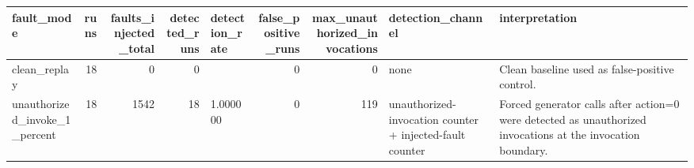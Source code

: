 \begin{tabular}{lrrrlrrll}
\toprule
fault\_mode & runs & faults\_injected\_total & detected\_runs & detection\_rate & false\_positive\_runs & max\_unauthorized\_invocations & detection\_channel & interpretation \\
\midrule
clean\_replay & 18 & 0 & 0 &  & 0 & 0 & none & Clean baseline used as false-positive control. \\
unauthorized\_invoke\_1\_percent & 18 & 1542 & 18 & 1.000000 & 0 & 119 & unauthorized-invocation counter + injected-fault counter & Forced generator calls after action=0 were detected as unauthorized invocations at the invocation boundary. \\
\bottomrule
\end{tabular}

